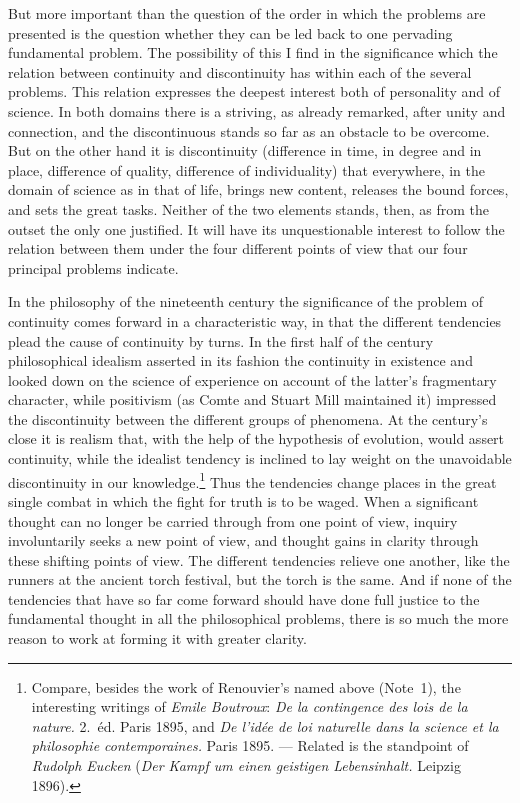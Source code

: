 \documentclass[12pt,a4paper]{book}
\newcommand{\opage}[1]{\marginnote{\footnotesize\textit{[#1]}}}
\begin{document}
But more important than the question of the order in which the problems are
presented is the question whether they can be led back to one pervading
fundamental problem. The possibility of this I find in the significance which
the relation between continuity and discontinuity has within each of the several
problems. This relation expresses the deepest interest both of personality and
of science. In both domains there is a striving, as already remarked, after
unity and connection, and the discontinuous stands so far as an obstacle to be
overcome. But on the other hand it is discontinuity (difference in time, in
degree and in place, difference of quality, difference of individuality) that
everywhere, in the domain of science as in that of life, brings new content,
releases the bound forces, and sets the great tasks. Neither of the two elements
stands, then, as from the outset the only one justified. It will have its
unquestionable interest to follow the relation between them under the four
different points of view that our four principal problems indicate.

In the philosophy of the nineteenth century the significance of the problem of
continuity comes forward in a characteristic way, in that the different
tendencies plead the cause of continuity by turns. In the first half of the
century philosophical idealism asserted in its fashion the continuity in
existence and looked down on the science of experience on account of the
latter's fragmentary character, while positivism (as Comte and Stuart Mill
maintained it) \opage{5}impressed the discontinuity between the different groups of
phenomena. At the century's close it is realism that, with the help of the
hypothesis of evolution, would assert continuity, while the idealist tendency is
inclined to lay weight on the unavoidable discontinuity in our
knowledge.\footnote{Compare, besides the work of Renouvier's named above
(Note~1), the interesting writings of \textit{Emile Boutroux}: \textit{De la
contingence des lois de la nature.} 2.~éd. Paris 1895, and \textit{De l'idée de
loi naturelle dans la science et la philosophie contemporaines.} Paris 1895. ---
Related is the standpoint of \textit{Rudolph Eucken} (\textit{Der Kampf um einen
geistigen Lebensinhalt.} Leipzig 1896).} Thus the tendencies change places in
the great single combat in which the fight for truth is to be waged. When a
significant thought can no longer be carried through from one point of view,
inquiry involuntarily seeks a new point of view, and thought gains in clarity
through these shifting points of view. The different tendencies relieve one
another, like the runners at the ancient torch festival, but the torch is the
same. And if none of the tendencies that have so far come forward should have
done full justice to the fundamental thought in all the philosophical problems,
there is so much the more reason to work at forming it with greater clarity.
\end{document}
